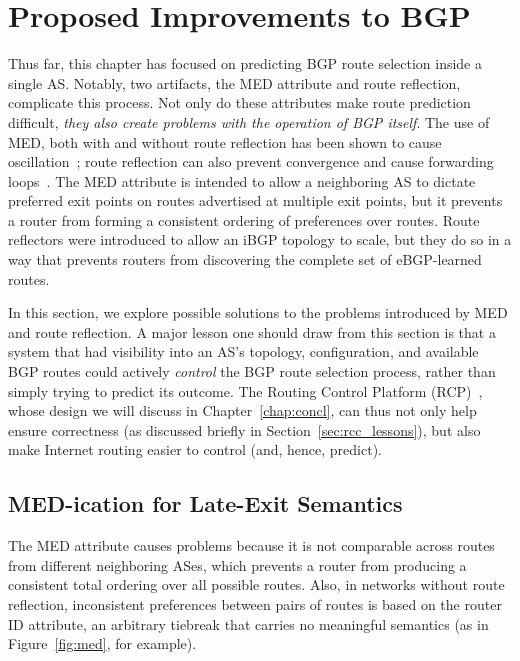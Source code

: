 \section{Proposed Improvements to BGP}\label{sec:discussion}

Thus far, this chapter has focused on predicting BGP route selection
inside a single AS.  Notably, two artifacts, the MED attribute and route
reflection, complicate this process.  Not only do these attributes make
route prediction difficult, {\em they also create problems with the
  operation of 
BGP itself}.  The use of MED, both with and without route reflection has
been shown to cause oscillation~\cite{Basu2002}; route reflection can
also prevent convergence and cause forwarding loops~\cite{Griffin2002}.
The MED attribute is intended to allow a neighboring AS to dictate
preferred exit points on routes advertised at multiple exit points, but
it prevents a router from forming a consistent ordering of preferences
over routes.  Route reflectors were introduced to allow an iBGP topology
to scale, but they do so in a way that prevents routers from 
discovering the complete set of eBGP-learned routes.  

In this section, we explore possible solutions to the problems
introduced by MED and route reflection.  A major lesson one should draw
from this section is that a system that had visibility into an AS's
topology, configuration, and available BGP routes could actively {\em
control} the BGP route selection process, rather than simply trying to
predict its outcome.  The Routing Control Platform
(RCP)~\cite{caesar2004,feamster:fdna2004}, whose design we will 
discuss in Chapter~\ref{chap:concl}, can thus not only help
ensure correctness (as discussed briefly in
Section~\ref{sec:rcc_lessons}), but also make Internet routing easier to
control (and, hence, predict).

\subsection{MED-ication for Late-Exit Semantics}\label{sec:sandbox:med_disc}


The MED attribute causes problems because it is not comparable across
routes from different neighboring ASes, which prevents a router from
producing a consistent total ordering over all possible routes.  Also,
in networks without route reflection, inconsistent
preferences between pairs of routes is based on the router ID attribute,
an arbitrary tiebreak that carries no meaningful semantics (as in
Figure~\ref{fig:med}, for example).  

